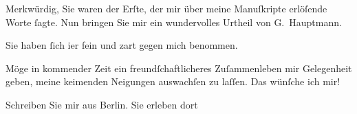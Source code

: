 \pstart
           Merkwürdig, Sie waren der Erſte, der mir über meine Manuſkripte erlöſende Worte
               ſagte. Nun bringen Sie mir ein wundervolles Urtheil{ }{\pb}von G. Hauptmann.\pend
           
\pstart
           Sie haben ſich i{\geminationm}er fein und zart gegen mich
               benommen.\pend
           
\pstart
           Möge in kommender Zeit ein freundſchaftlicheres
               Zuſammenleben mir Gelegenheit geben, meine keimenden Neigungen auswachſen zu laſſen.
               Das wünſche ich mir!\pend
           
\pstart
           Schreiben Sie mir aus Berlin. Sie erleben dort
